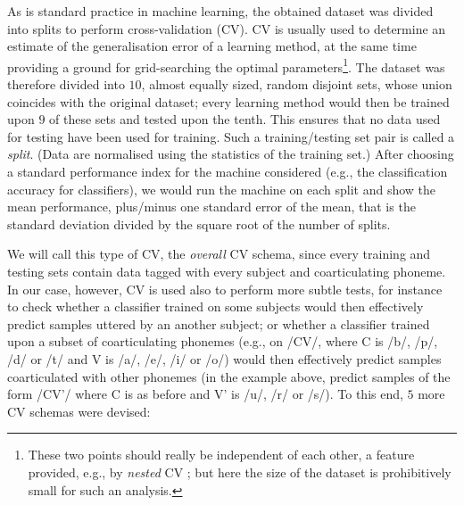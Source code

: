 As is standard practice in machine learning, the obtained dataset was divided into
splits to perform cross-validation (CV). CV \cite{stat} is usually used
to determine an estimate of the generalisation error of a learning method, at the
same time providing a ground for grid-searching the optimal parameters\footnote{These
two points should really be independent of each other, a feature provided, e.g., by
\emph{nested} CV \cite{nestedCV}; but here the size of the dataset is
prohibitively small for such an analysis.}. The dataset was therefore divided into
$10$, almost equally sized, random disjoint sets,
whose union coincides with the original dataset; every
learning method would then be trained upon $9$ of these sets and tested upon the
tenth. This ensures that no data used for testing have been used for training. Such a
training/testing set pair is called a \emph{split}. (Data are normalised using the
statistics of the training set.) After choosing a standard performance index for the machine
considered (e.g., the classification accuracy for classifiers), we would run the machine
on each split and show the mean performance, plus/minus one standard error of the mean,
that is the standard deviation divided by the square root of the number of splits.

We will call this type of CV, the \emph{overall} CV schema,
since every training and testing sets contain data tagged with every subject and
coarticulating phoneme. In our case, however, CV is used also to perform more subtle
tests, for instance to check whether a classifier trained on some subjects would
then effectively predict samples uttered by an another subject; or whether a classifier
trained upon a subset of coarticulating phonemes (e.g., on /CV/, where C is /b/, /p/,
/d/ or /t/ and V is /a/, /e/, /i/ or /o/) would then effectively predict samples
coarticulated with other phonemes (in the example above, predict samples of the form
/CV'/ where C is as before and V' is /u/, /r/ or /s/).
To this end, $5$ more CV schemas were devised:

